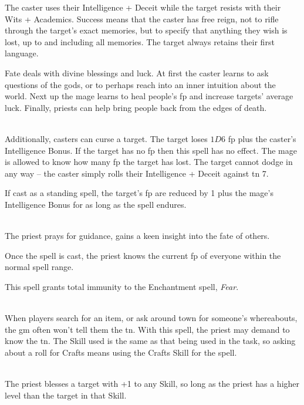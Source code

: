 \begin{multicols}{2}
The caster uses their Intelligence + Deceit while the target resists with their Wits + Academics.
Success means that the caster has free reign, not to rifle through the target's exact memories, but to specify that anything they wish is lost, up to and including all memories.
The target always retains their first language.

\end{multicols}

Fate deals with divine blessings and luck. At first the caster learns to ask questions of the gods, or to perhaps reach into an inner intuition about the world. Next up the mage learns to heal people's \gls{fp} and increase targets' average luck. Finally, priests can help bring people back from the edges of death.
\begin{multicols}{2}

\spelllevel

\\
Additionally, casters can curse a target. The target loses $1D6$ \gls{fp} plus the caster's Intelligence Bonus. If the target has no \gls{fp} then this spell has no effect. The mage is allowed to know how many \gls{fp} the target has lost. The target cannot dodge in any way -- the caster simply rolls their Intelligence + Deceit against \gls{tn} 7.

If cast as a standing spell, the target's \gls{fp} are reduced by 1 plus the mage's Intelligence Bonus for as long as the spell endures.

\\
The priest prays for guidance, gains a keen insight into the fate of others.

Once the spell is cast, the priest knows the current \gls{fp} of everyone within the normal spell range.

This spell grants total immunity to the Enchantment spell, \textit{Fear}.

\\
When players search for an item, or ask around town for someone's whereabouts, the \gls{gm} often won't tell them the \gls{tn}.  With this spell, the priest may demand to know the \gls{tn}.  The Skill used is the same as that being used in the task, so asking about a roll for Crafts means using the Crafts Skill for the spell.

\\
The priest blesses a target with +1 to any Skill, so long as the priest has a higher level than the target in that Skill.


\end{multicols}
